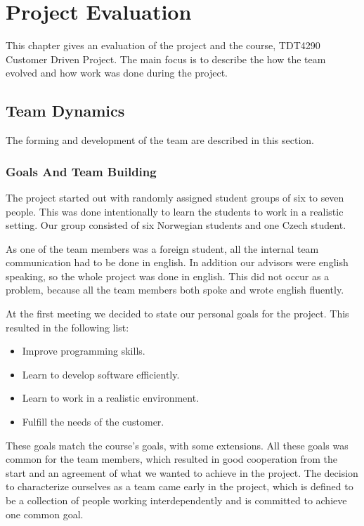 \chapter{Project Evaluation}
This chapter gives an evaluation of the project and the course, TDT4290 Customer Driven Project. The main focus is to describe the how the team evolved and how work was done during the project.   

\section{Team Dynamics}
The forming and development of the team are described in this section.
\subsection{Goals And Team Building}
The project started out with randomly assigned student groups of six to seven people. This was done intentionally to learn the students to work in a realistic setting. Our group consisted of six Norwegian students and one Czech student. 

As one of the team members was a foreign student, all the internal team communication had to be done in english. In addition our advisors were english speaking, so the whole project was done in english. This did not occur as a problem, because all the team members both spoke and wrote english fluently.

At the first meeting we decided to state our personal goals for the project. This resulted in the following list:
\begin{itemize}
	\item Improve programming skills.
	\item Learn to develop software efficiently.
	\item Learn to work in a realistic environment.
	\item Fulfill the needs of the customer. 
\end{itemize}
These goals match the course's goals, with some extensions. All these goals was common for the team members, which resulted in good cooperation from the start and an agreement of what we wanted to achieve in the project. The decision to characterize ourselves as a team came early in the project, which is defined to be a collection of people working interdependently and is committed to achieve one common goal.

